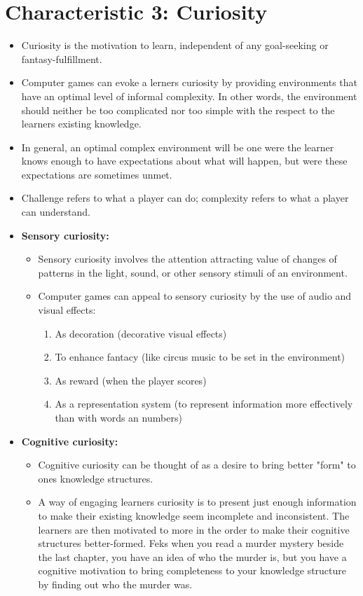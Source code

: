  \section*{Characteristic 3: Curiosity}
    \begin{itemize}
      \item Curiosity is the motivation to learn, independent of any goal-seeking or fantasy-fulfillment. 
      \item Computer games can evoke a lerners curiosity by providing environments that have an optimal level of informal complexity. In other words, the environment should neither be too complicated nor too simple with the respect to the learners existing knowledge. 
      \item In general, an optimal complex environment will be one were the learner knows enough to have expectations about what will happen, but were these expectations are sometimes unmet. 
      \item Challenge refers to what a player can do; complexity refers to what a player can understand.
      \item {\bf Sensory curiosity:}
        \begin{itemize}
          \item Sensory curiosity involves the attention attracting value of changes of patterns in the light, sound, or other sensory stimuli of an environment. 
          \item Computer games can appeal to sensory curiosity by the use of audio and visual effects: 
            \begin{enumerate}
              \item As decoration (decorative visual effects)
              \item To enhance fantacy (like circus music to be set in the environment)
              \item As reward (when the player scores)
              \item As a representation system (to represent information more effectively than with words an numbers)
            \end{enumerate}
        \end{itemize}
      \item {\bf Cognitive curiosity:}
        \begin{itemize}
          \item Cognitive curiosity can be thought of as a desire to bring better "form" to ones knowledge structures.
          \item A way of engaging learners curiosity is to present just enough information to make their existing knowledge seem incomplete and inconsistent. The learners are then motivated to more in the order to make their cognitive structures better-formed. Feks when you read a murder mystery beside the last chapter, you have an idea of who the murder is, but you have a cognitive motivation to bring completeness to your knowledge structure by finding out who the murder was. 

\end{itemize}
\end{itemize}
